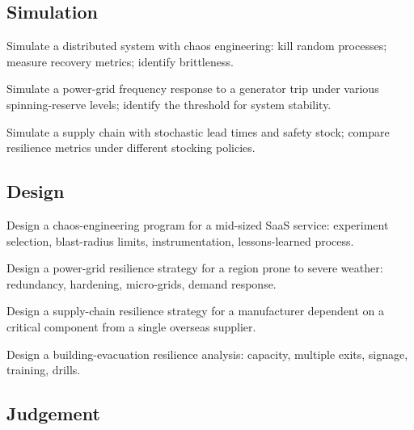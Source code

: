 \subsection*{Simulation}

\begin{exercise}
Simulate a distributed system with chaos engineering: kill random processes; measure recovery metrics; identify brittleness.
\end{exercise}

\begin{exercise}
Simulate a power-grid frequency response to a generator trip under various spinning-reserve levels; identify the threshold for system stability.
\end{exercise}

\begin{exercise}
Simulate a supply chain with stochastic lead times and safety stock; compare resilience metrics under different stocking policies.
\end{exercise}

\subsection*{Design}

\begin{exercise}
Design a chaos-engineering program for a mid-sized SaaS service: experiment selection, blast-radius limits, instrumentation, lessons-learned process.
\end{exercise}

\begin{exercise}
Design a power-grid resilience strategy for a region prone to severe weather: redundancy, hardening, micro-grids, demand response.
\end{exercise}

\begin{exercise}
Design a supply-chain resilience strategy for a manufacturer dependent on a critical component from a single overseas supplier.
\end{exercise}

\begin{exercise}
Design a building-evacuation resilience analysis: capacity, multiple exits, signage, training, drills.
\end{exercise}

\subsection*{Judgement}


